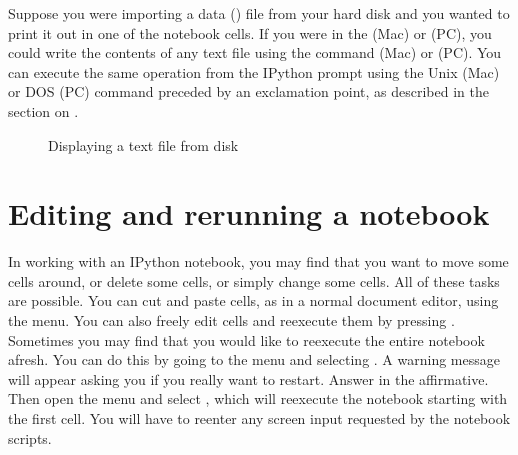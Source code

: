 \documentclass[letterpaper,10pt,english]{sphinxmanual}
\begin{document}
\sphinxAtStartPar
Suppose you were importing a data () file from your hard disk and you wanted to print it out in one of the notebook cells.  If you were in the  (Mac) or  (PC), you could write the contents of any text file using the command   (Mac) or   (PC).  You can execute the same operation from the IPython prompt using the Unix (Mac) or DOS (PC) command preceded by an exclamation point, as described in the section on {\hyperref[\detokenize{chap2/chap2_basics:syscommands}]{}}.

\begin{figure}[htbp]
\centering
\capstart

\noindent{}
\caption{Displaying a text file from disk}\label{\detokenize{apdx2/apdx2_ipynb:id7}}\label{\detokenize{apdx2/apdx2_ipynb:fig-ipynotefinalbottom}}\end{figure}


\section{Editing and rerunning a notebook}
\label{\detokenize{apdx2/apdx2_ipynb:editing-and-rerunning-a-notebook}}
\sphinxAtStartPar
In working with an IPython notebook, you may find that you want to move some cells around, or delete some cells, or simply change some cells.  All of these tasks are possible.  You can  cut and paste cells, as in a normal document editor, using the  menu.  You can also freely edit cells and re\sphinxhyphen{}execute them by  pressing .  Sometimes you may find that you would like to re\sphinxhyphen{}execute the entire notebook afresh.  You can do this by going to the  menu and selecting .  A warning message will appear asking you if you really want to restart.  Answer in the affirmative.  Then open the  menu and select , which will re\sphinxhyphen{}execute the notebook starting with the first cell.  You will have to re\sphinxhyphen{}enter any screen input requested by the notebook scripts.
\end{document}
